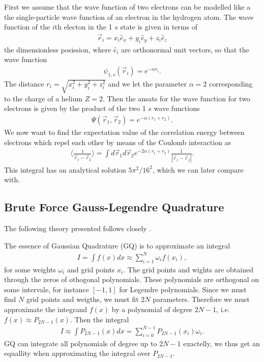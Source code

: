 \documentclass[twocolumn]{aastex62}
\begin{document}
First we assume that the wave function of two electrons can be modelled like a the single-particle wave function of an electron in the hydrogen atom. The wave function of the $i$th electon in the 1 $s$ state is given in terms of
\begin{align}
	\vec{r}_i = x_i \hat{e}_x + y_i\hat{e}_y + z_i\hat{e}_z
\end{align} 
the dimensionless posission, where $\hat{e}_i$ are orthonormal unit vectors, so that the wave function
\begin{align}
	\psi_{1,s}(\vec{r}_i) = e^{-\alpha r_i}.
\end{align}
The distance $r_i = \sqrt{x_i^2 + y_i^2 + z_i^2}$ and we let the parameter $\alpha = 2$ corresponding to the charge of a helium $Z = 2$. Then the ansats for the wave function for two electrons is given by the product of the two 1 $s$ wave functions 
\begin{align}
	\Psi(\vec{r}_1, \vec{r}_2) = e^{-\alpha(r_1 + r_2)}.
\end{align}
We now want to find the expectation value of the correlation energy between electrons which repel each other by means of the Coulomb interaction as 
\begin{align}
\langle \frac{
1}{\vec{r}_1 - \vec{r}_2}\rangle = \int d\vec{r}_1d\vec{r}_2 e^{-2\alpha(r_1 + r_2)}\frac{1}{|\vec{r}_1 - \vec{r}_2|}.
\end{align}
This integral has an analytical solution $5\pi^2/16^2$, which we can later compare with.
\subsection{Brute Force Gauss-Legendre Quadrature}
The following theory presented follows closely \citep[Ch. 5.3]{jensen:2019}. 

The essence of Gaussian Quadrature (GQ) is to approximate an integral 
\begin{align}
	I = \int f(x) dx \approx \sum^N_{i = 1} \omega_i f(x_i),
\end{align} 
for some weights $\omega_i$ and grid points $x_i$. The grid points and wights are obtained through the zeros of othogonal polynomials. These polynomials are orthogonal on some intervale, for instance $[-1, 1]$ for Legendre polynomials. Since we must find $N$ grid points and weigths, we must fit $2N$ parameters. Therefore we must approximate the integrand $f(x)$ by a polynomial of degree $2N-1$, i.e. $f(x) \approx P_{2N-1}(x)$. Then the integral 
\begin{align}
	I \approx \int P_{2N-1}(x)dx = \sum^{N-1}_{i=0}P_{2N-1}(x_i) \omega_i.
\end{align} 
GQ can integrate all polynomials of degree up to $2N-1$ exactelly, we thus get an equallity when approximating the integral over $P_{2N-1}$. 
\end{document}
